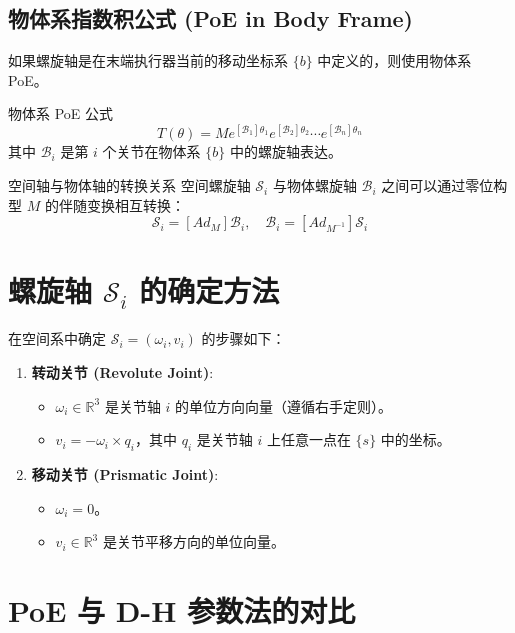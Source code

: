 \subsection{物体系指数积公式 (PoE in Body Frame)}

如果螺旋轴是在末端执行器当前的移动坐标系 $\{b\}$ 中定义的，则使用物体系 PoE。

\begin{formulabox}{物体系 PoE 公式}
\begin{equation}
T(\theta) = M e^{[\mathcal{B}_1]\theta_1} e^{[\mathcal{B}_2]\theta_2} \cdots e^{[\mathcal{B}_n]\theta_n}
\end{equation}
其中 $\mathcal{B}_i$ 是第 $i$ 个关节在物体系 $\{b\}$ 中的螺旋轴表达。
\end{formulabox}

\begin{mybox}{空间轴与物体轴的转换关系}
空间螺旋轴 $\mathcal{S}_i$ 与物体螺旋轴 $\mathcal{B}_i$ 之间可以通过零位构型 $M$ 的伴随变换相互转换：
\[ \mathcal{S}_i = [Ad_M] \mathcal{B}_i, \quad \mathcal{B}_i = [Ad_{M^{-1}}] \mathcal{S}_i \]
\end{mybox}

\section{螺旋轴 $\mathcal{S}_i$ 的确定方法}

在空间系中确定 $\mathcal{S}_i = (\omega_i, v_i)$ 的步骤如下：

\begin{enumerate}
    \item \textbf{转动关节 (Revolute Joint)}:
    \begin{itemize}
        \item $\omega_i \in \mathbb{R}^3$ 是关节轴 $i$ 的单位方向向量（遵循右手定则）。
        \item $v_i = -\omega_i \times q_i$，其中 $q_i$ 是关节轴 $i$ 上任意一点在 $\{s\}$ 中的坐标。
    \end{itemize}
    \item \textbf{移动关节 (Prismatic Joint)}:
    \begin{itemize}
        \item $\omega_i = 0$。
        \item $v_i \in \mathbb{R}^3$ 是关节平移方向的单位向量。
    \end{itemize}
\end{enumerate}



\section{PoE 与 D-H 参数法的对比}

